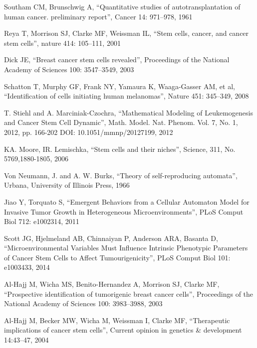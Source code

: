 \begin{thebibliography}{}

 Southam CM, Brunschwig A, 
``Quantitative studies of autotransplantation of human cancer. preliminary report'', 
Cancer 14: 971–978, 1961 

 Reya T, Morrison SJ, Clarke MF, Weissman IL, 
``Stem cells, cancer, and cancer stem cells'', 
nature 414: 105–111, 2001 

 Dick JE,  
``Breast cancer stem cells revealed'', 
Proceedings of the National Academy of Sciences 100: 3547–3549, 2003

 Schatton T, Murphy GF, Frank NY, Yamaura K, Waaga-Gasser AM, et al, 
``Identification of cells initiating human melanomas'', 
Nature 451: 345–349, 2008


 T. Stiehl and A. Marciniak-Czochra,
``Mathematical Modeling of Leukemogenesis and Cancer Stem Cell Dynamic'', 
Math. Model. Nat. Phenom. Vol. 7, No. 1, 2012, pp. 166-202 DOI: 10.1051/mmnp/20127199, 2012

 KA. Moore, IR. Lemischka, 
``Stem cells and their niches'', 
Science, 311, No. 5769,1880-1805, 2006

 Von Neumann, J. and A. W. Burks, 
``Theory of self-reproducing automata'',  
Urbana, University of Illinois Press, 1966

 Jiao Y, Torquato S, 
``Emergent Behaviors from a Cellular Automaton Model for Invasive Tumor Growth in Heterogeneous Microenvironments'', 
PLoS Comput Biol 712: e1002314, 2011 

 Scott JG, Hjelmeland AB, Chinnaiyan P, Anderson ARA, Basanta D, 
``Microenvironmental Variables Must Influence Intrinsic Phenotypic Parameters of Cancer Stem Cells to Affect Tumourigenicity'', 
PLoS Comput Biol 101: e1003433,  2014 


 Al-Hajj M, Wicha MS, Benito-Hernandez A, Morrison SJ, Clarke MF, 
``Prospective identification of tumorigenic breast cancer cells'', 
Proceedings of the National Academy of Sciences 100: 3983–3988, 2003

 Al-Hajj M, Becker MW, Wicha M, Weissman I, Clarke MF,  
``Therapeutic implications of cancer stem cells'', 
Current opinion in genetics \& development 14:43–47, 2004


\end{thebibliography}
